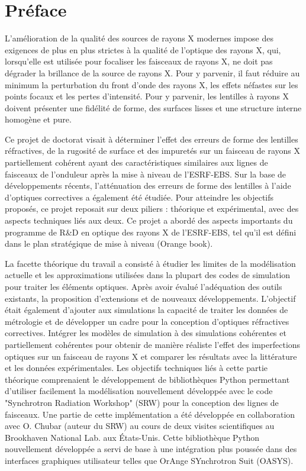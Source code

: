 \chapter*{Préface}

L'amélioration de la qualité des sources de rayons X modernes impose des exigences de plus en plus strictes à la qualité de l'optique des rayons X, qui, lorsqu'elle est utilisée pour focaliser les faisceaux de rayons X, ne doit pas dégrader la brillance de la source de rayons X. Pour y parvenir, il faut réduire au minimum la perturbation du front d'onde des rayons X, les effets néfastes sur les points focaux et les pertes d'intensité. Pour y parvenir, les lentilles à rayons X doivent présenter une fidélité de forme, des surfaces lisses et une structure interne homogène et pure. 

Ce projet de doctorat visait à déterminer l'effet des erreurs de forme des lentilles réfractives, de la rugosité de surface et des impuretés sur un faisceau de rayons X partiellement cohérent ayant des caractéristiques similaires aux lignes de faisceaux de l'onduleur après la mise à niveau de l'ESRF-EBS. Sur la base de développements récents, l'atténuation des erreurs de forme des lentilles à l'aide d'optiques correctives a également été étudiée. Pour atteindre les objectifs proposés, ce projet reposait sur deux piliers : théorique et expérimental, avec des aspects techniques liés aux deux. Ce projet a abordé des aspects importants du programme de R\&D en optique des rayons X de l'ESRF-EBS, tel qu'il est défini dans le plan stratégique de mise à niveau (Orange book).

La facette théorique du travail a consisté à étudier les limites de la modélisation actuelle et les approximations utilisées dans la plupart des codes de simulation pour traiter les éléments optiques. Après avoir évalué l'adéquation des outils existants, la proposition d'extensions et de nouveaux développements. L'objectif était également d'ajouter aux simulations la capacité de traiter les données de métrologie et de développer un cadre pour la conception d'optiques réfractives correctives. Intégrer les modèles de simulation à des simulations cohérentes et partiellement cohérentes pour obtenir de manière réaliste l'effet des imperfections optiques sur un faisceau de rayons X et comparer les résultats avec la littérature et les données expérimentales. Les objectifs techniques liés à cette partie théorique comprenaient le développement de bibliothèques Python permettant d'utiliser facilement la modélisation nouvellement développée avec le code "Synchrotron Radiation Workshop" (SRW) pour la conception des lignes de faisceaux. Une partie de cette implémentation a été développée en collaboration avec O. Chubar (auteur du SRW) au cours de deux visites scientifiques au Brookhaven National Lab. aux États-Unis. Cette bibliothèque Python nouvellement développée a servi de base à une intégration plus poussée dans des interfaces graphiques utilisateur telles que OrAnge SYnchrotron Suit (OASYS). 

